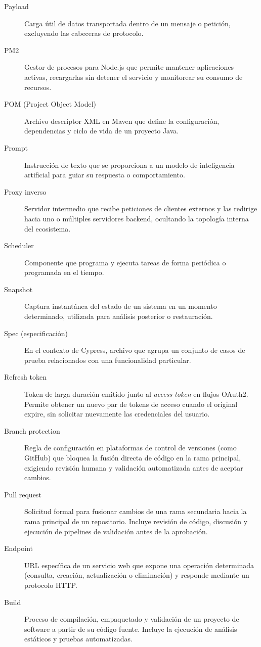 \begin{description}
    \item[Payload] Carga útil de datos transportada dentro de un mensaje o petición, excluyendo las cabeceras de protocolo.
    \item[PM2] Gestor de procesos para Node.js que permite mantener aplicaciones activas, recargarlas sin detener el servicio y monitorear su consumo de recursos.
    \item[POM (Project Object Model)] Archivo descriptor XML en Maven que define la configuración, dependencias y ciclo de vida de un proyecto Java.
    \item[Prompt] Instrucción de texto que se proporciona a un modelo de inteligencia artificial para guiar su respuesta o comportamiento.
    \item[Proxy inverso] Servidor intermedio que recibe peticiones de clientes externos y las redirige hacia uno o múltiples servidores backend, ocultando la topología interna del ecosistema.
    \item[Scheduler] Componente que programa y ejecuta tareas de forma periódica o programada en el tiempo.
    \item[Snapshot] Captura instantánea del estado de un sistema en un momento determinado, utilizada para análisis posterior o restauración.
    \item[Spec (especificación)] En el contexto de Cypress, archivo que agrupa un conjunto de casos de prueba relacionados con una funcionalidad particular.
    \item[Refresh token] Token de larga duración emitido junto al \textit{access token} en flujos OAuth2. Permite obtener un nuevo par de tokens de acceso cuando el original expire, sin solicitar nuevamente las credenciales del usuario.
    \item[Branch protection] Regla de configuración en plataformas de control de versiones (como GitHub) que bloquea la fusión directa de código en la rama principal, exigiendo revisión humana y validación automatizada antes de aceptar cambios.
    \item[Pull request] Solicitud formal para fusionar cambios de una rama secundaria hacia la rama principal de un repositorio. Incluye revisión de código, discusión y ejecución de pipelines de validación antes de la aprobación.
    \item[Endpoint] URL específica de un servicio web que expone una operación determinada (consulta, creación, actualización o eliminación) y responde mediante un protocolo HTTP.
    \item[Build] Proceso de compilación, empaquetado y validación de un proyecto de software a partir de su código fuente. Incluye la ejecución de análisis estáticos y pruebas automatizadas.

\end{description}
